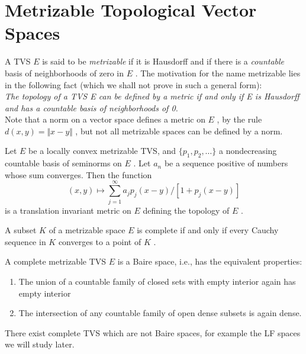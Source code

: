 \section{Metrizable Topological Vector Spaces}

A TVS $ E $ is said to be \textit{metrizable} if it is Hausdorff and if there is a \textit{countable} basis of neighborhoods of zero in $ E $ . The motivation for the name metrizable lies in the following fact (which we shall not prove in such a general form): \\

\indent \textit{The topology of a TVS E can be defined by a metric if and only if E is Hausdorff and has a countable basis of neighborhoods of 0.} \\

\indent Note that a norm on a vector space defines a metric on $ E $ , by the rule $ d(x,y) = \Vert x - y \Vert $ , but not all metrizable spaces can be defined by a norm.

\begin{prop}
	Let $ E $ be a locally convex metrizable TVS, and $ \{ p_{ 1 }, p_{ 2 }, \ldots \} $ a nondecreasing countable basis of seminorms on $ E $ . Let $ a_{ n } $ be a sequence positive of numbers whose sum converges. Then the function
	\[
		(x,y) \mapsto \sum_{ j=1 }^{ \infty } a_{ j } p_{ j }(x-y) / \left[ 1 + p_{ j }(x-y) \right]
	\]
	is a translation invariant metric on $ E $ defining the topology of $ E $ .
\end{prop}

\begin{prop}
	A subset $ K $ of a metrizable space $ E $ is complete if and only if every Cauchy sequence in $ K $ converges to a point of $ K $ .
\end{prop}

\begin{prop}
	A complete metrizable TVS $ E $ is a Baire space, i.e., has the equivalent properties:
	\begin{enumerate}
		\item The union of a countable family of closed sets with empty interior again has empty interior
		\item The intersection of any countable family of open dense subsets is again dense.
	\end{enumerate}
	
\end{prop}

\begin{rmk}
	There exist complete TVS which are not Baire spaces, for example the LF spaces we will study later.
\end{rmk}

